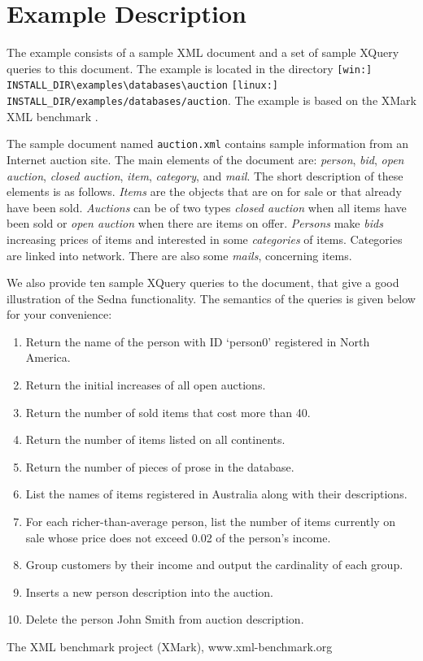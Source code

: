 \documentclass[a4paper,12pt]{article}
\begin{document}
\section{Example Description}
\label{sec:example-description}
The example consists of a sample XML document and a set of sample XQuery queries to this document. The example is located in the directory \verb![win:] INSTALL_DIR\examples\databases\auction! \verb![linux:] INSTALL_DIR/examples/databases/auction!. The example is based on the XMark XML benchmark \cite{xmark}.

The sample document named \verb!auction.xml! contains sample information from an Internet auction site. The main elements of the document are: \emph{person}, \emph{bid}, \emph{open auction}, \emph{closed auction}, \emph{item}, \emph{category}, and \emph{mail}. The short description of these elements is as follows. \emph{Items} are the objects that are on for sale or that already have been sold. \emph{Auctions} can be of two types \emph{closed auction} when all items have been sold or \emph{open auction} when there are items on offer. \emph{Persons} make \emph{bids} increasing prices of items and interested in some \emph{categories} of items. Categories are linked into network. There are also some \emph{mails}, concerning items. 

We also provide ten sample XQuery queries to the document, that give a good illustration of the Sedna functionality. The semantics of the queries is given below for your convenience:
\begin{enumerate}
\item Return the name of the person with ID `person0' registered in North
 America.
\item Return the initial increases of all open auctions.
\item Return the number of sold items that cost more than 40.
\item Return the number of items listed on all continents.
\item Return the number of pieces of prose in the database.
\item List the names of items registered in Australia along with their
 descriptions.
\item For each richer-than-average person, list the number of items currently
 on sale whose price does not exceed 0.02 of the person's income.
\item Group customers by their income and output the cardinality of each group.
\item Inserts a new person description into the auction.
\item Delete the person John Smith from auction description.
\end{enumerate}

\begin{thebibliography}{9}
 The XML benchmark project (XMark), www.xml-benchmark.org
\end{thebibliography}
\end{document}
